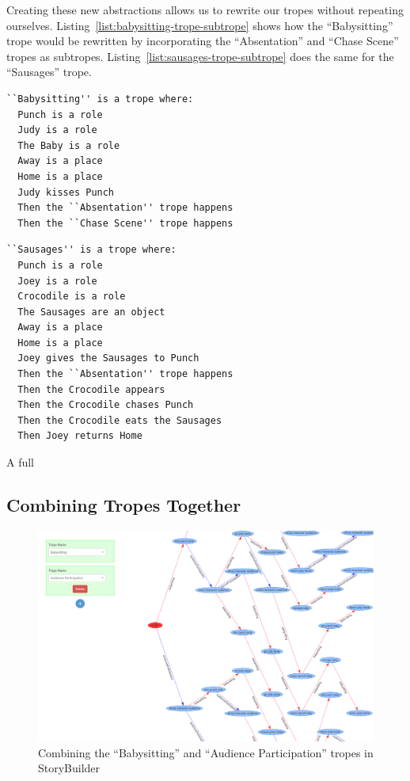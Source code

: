\documentclass[11pt]{report}
\begin{document}
Creating these new abstractions allows us to rewrite our tropes without
repeating ourselves. Listing~\ref{list:babysitting-trope-subtrope} shows how the
``Babysitting'' trope would be rewritten by incorporating the ``Absentation''
and ``Chase Scene'' tropes as subtropes.
Listing~\ref{list:sausages-trope-subtrope} does the same for the ``Sausages'' trope.

\begin{minipage}{\textwidth}
\begin{lstlisting}[label={list:babysitting-trope-subtrope},caption={The ``Babysitting''
trope, redefined with a subtrope}]
``Babysitting'' is a trope where:
  Punch is a role
  Judy is a role
  The Baby is a role
  Away is a place
  Home is a place
  Judy kisses Punch
  Then the ``Absentation'' trope happens
  Then the ``Chase Scene'' trope happens
\end{lstlisting}
\end{minipage}

\begin{minipage}{\textwidth}
\begin{lstlisting}[label={list:sausages-trope-subtrope},caption={The ``Sausages''
trope, redefined with a subtrope}]
``Sausages'' is a trope where:
  Punch is a role
  Joey is a role
  Crocodile is a role
  The Sausages are an object
  Away is a place
  Home is a place
  Joey gives the Sausages to Punch
  Then the ``Absentation'' trope happens
  Then the Crocodile appears
  Then the Crocodile chases Punch
  Then the Crocodile eats the Sausages
  Then Joey returns Home
\end{lstlisting}
\end{minipage}

A full 

\subsection{Combining Tropes Together}
\label{sec:combining-tropes}

\begin{figure}[!t]
\centerline{\includegraphics[width=\textwidth]{trope-combining.png}}
\caption{Combining the ``Babysitting'' and ``Audience Participation'' tropes in StoryBuilder}\label{fig:combining-tropes}
\end{figure}
\end{document}
